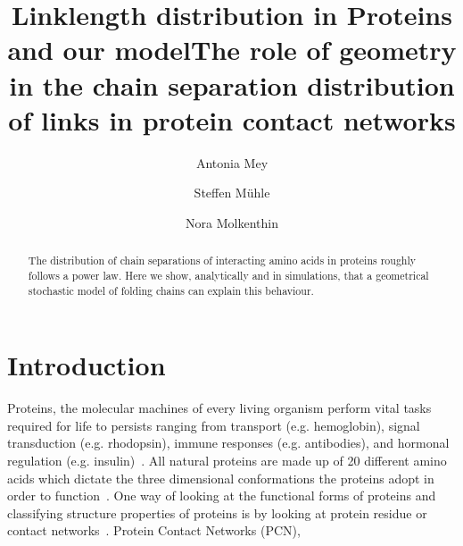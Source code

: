 \documentclass[reprint,amsmath,amssymb,rmp,onecolumn,notitlepage,11pt]{revtex4-1}
\begin{document}
\title{Linklength distribution in Proteins and our model}
\title{The role of geometry in the chain separation distribution of links in protein contact networks}
\author{Antonia Mey}
\author{Steffen Mühle}
\author{Nora Molkenthin}

\begin{abstract}
The distribution of chain separations of interacting amino acids in proteins roughly follows a power law. Here we show, analytically and in simulations, that a geometrical stochastic model of folding chains can explain this behaviour. %
\end{abstract}
\maketitle

\section*{Introduction}
Proteins, the molecular machines of every living organism perform vital tasks required for life to persists ranging from transport (e.g. hemoglobin), signal transduction (e.g. rhodopsin), immune responses (e.g. antibodies), and hormonal regulation (e.g. insulin)~\cite{}. All natural proteins are made up of 20 different amino acids which dictate the three dimensional conformations the proteins adopt in order to function~\cite{}. One way of looking at the functional forms of proteins and classifying structure properties of proteins is by looking at protein residue or contact networks~\cite{Vendruscolo2002,DiPaola2013,Estrada2011}. Protein Contact Networks (PCN), 
\end{document}
